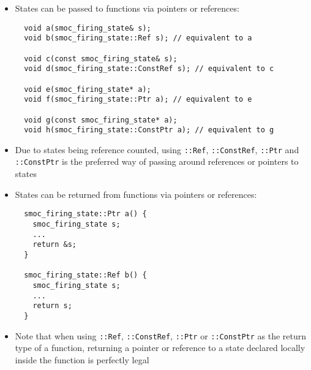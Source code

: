 \begin{frame}[fragile=singleslide]
\begin{itemize}
\item States can be passed to functions via pointers or references:
\begin{lstlisting}
  void a(smoc_firing_state& s);
  void b(smoc_firing_state::Ref s); // equivalent to a
  
  void c(const smoc_firing_state& s);
  void d(smoc_firing_state::ConstRef s); // equivalent to c

  void e(smoc_firing_state* a);
  void f(smoc_firing_state::Ptr a); // equivalent to e

  void g(const smoc_firing_state* a);
  void h(smoc_firing_state::ConstPtr a); // equivalent to g
\end{lstlisting}
\item Due to states being reference counted, using \texttt{::Ref}, \texttt{::ConstRef}, \texttt{::Ptr} and \texttt{::ConstPtr} is the preferred way
      of passing around references or pointers to states
\end{itemize}
\end{frame}

\begin{frame}[fragile=singleslide]
\begin{itemize}
\item States can be returned from functions via pointers or references:
\begin{lstlisting}
  smoc_firing_state::Ptr a() {
    smoc_firing_state s;
    ...
    return &s;
  }
  
  smoc_firing_state::Ref b() {
    smoc_firing_state s;
    ...
    return s;
  }
\end{lstlisting}
\item Note that when using \texttt{::Ref}, \texttt{::ConstRef}, \texttt{::Ptr} or \texttt{::ConstPtr} as the return type of a function,
      returning a pointer or reference to a state declared locally inside the function is perfectly legal
\end{itemize}
\end{frame}
